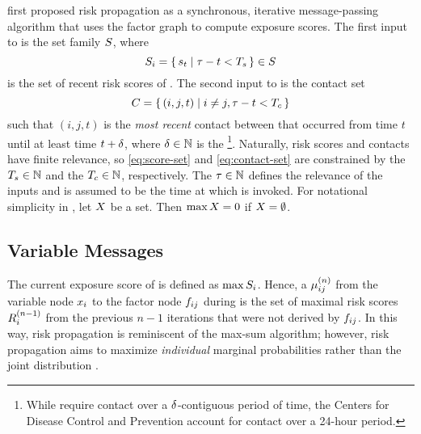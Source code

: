 \citet{Ayday2021} first proposed risk propagation as a synchronous, iterative message-passing algorithm that uses the factor graph to compute exposure scores. The first input to \cRiskPropagation{} is the set family $S$, where
\begin{equation} \label{eq:score-set}
  S_i =\set{ s_t | \tau- t < T_s} \in S
\end{equation}
is the set of recent risk scores of . The second input to \cRiskPropagation{} is the contact set
\begin{equation} \label{eq:contact-set}
  C = \set{ (i, j, t) | i \neq j, \tau- t < T_c}
\end{equation}
such that $(i, j, t)$ is the \emph{most recent} contact between  that occurred from time $t$ until at least time $t + \delta$, where $\delta \in \mathbb{N}$ is the \footnote{While \citet{Ayday2021} require contact over a $\delta$-contiguous period of time, the Centers for Disease Control and Prevention \citeyearpar{CDC2021} account for contact over a 24-hour period.}. Naturally, risk scores and contacts have finite relevance, so \eqref{eq:score-set} and \eqref{eq:contact-set} are constrained by the  $T_s \in \mathbb{N}$ and the  $T_c \in \mathbb{N}$, respectively. The  $\tau \in \mathbb{N}$ defines the relevance of the inputs and is assumed to be the time at which \cRiskPropagation{} is invoked. For notational simplicity in \cRiskPropagation{}, let $X$ be a set. Then $\max X = 0$ if $X = \emptyset$.

\subsection{Variable Messages}

The current exposure score of  is defined as $\max S_i$. Hence, a  $\mu_{ij}^{(n)}$ from the variable node $\vVariable[i]$ to the factor node $\vFactor[ij]$ during  is the set of maximal risk scores $R_{i}^{(n - 1)}$ from the previous $n - 1$ iterations that were not derived by $\vFactor[ij]$. In this way, risk propagation is reminiscent of the max-sum algorithm; however, risk propagation aims to maximize \emph{individual} marginal probabilities rather than the joint distribution \cite[pp. 411--415]{Bishop2006}.

